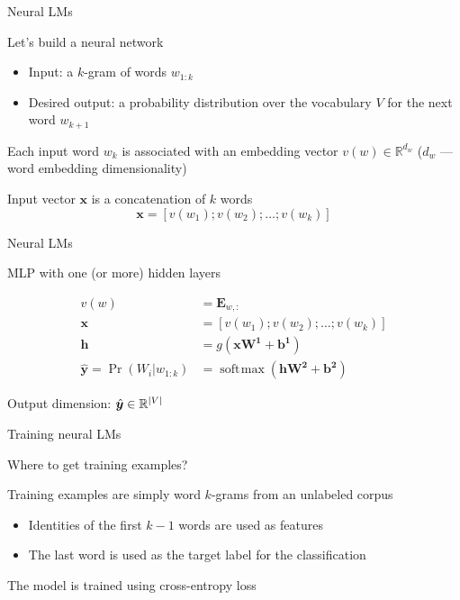 \documentclass[12pt,aspectratio=169,handout]{beamer}
\DeclareMathOperator*{\softmax}{soft\!\max}
\begin{document}
\begin{frame}{Neural LMs}
	
	Let's build a neural network
	\begin{itemize}
		\item Input: a $k$-gram of words $w_{1:k}$
		\item Desired output: a probability distribution over the vocabulary $V$ for the next word $w_{k+1}$
	\end{itemize}
	
	Each input word $w_k$ is associated with an embedding vector $v(w) \in \mathbb{R}^{d_w}$ ($d_w$ --- word embedding dimensionality)
	
	Input vector $\bm{x}$ is a concatenation of $k$ words
	$$
	\bm{x} = \left[ v(w_1); v(w_2); \ldots; v(w_k) \right]
	$$
	
\end{frame}

\begin{frame}{Neural LMs}
	
	MLP with one (or more) hidden layers
	
	$$
	\begin{aligned}
		v(w) &= \bm{E}_{w,:} \\
		\bm{x} &= \left[ v(w_1); v(w_2); \ldots; v(w_k) \right] \\
		\bm{h} &= g(\bm{x} \bm{W^1} + \bm{b^1}) \\
		\hat{\bm{y}} = \Pr(W_i | w_{1:k}) &= \softmax (\bm{h} \bm{W^2} + \bm{b^2})
	\end{aligned}
	$$
	
	Output dimension: $\hat{\bm{y}} \in \mathbb{R}^{\abs{V}}$
	
\end{frame}

\begin{frame}{Training neural LMs}
	
	Where to get training examples?
	
	Training examples are simply word $k$-grams from an unlabeled corpus
	\begin{itemize}
		\item Identities of the first $k - 1$ words are used as features
		\item The last word is used as the target label for the classification
	\end{itemize}
	
	The model is trained using cross-entropy loss
\end{frame}
\end{document}
